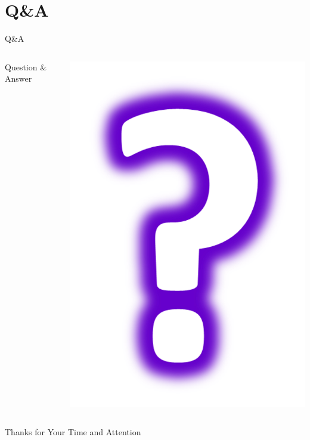 \section{Q\&A}
\begin{frame}{Q\&A}
\begin{columns}
\begin{column}{0.7\textwidth}
\begin{center}
    {\Huge Question \& Answer}

\end{center}

\end{column}
\begin{column}{0.3\textwidth}

\begin{center}
 \includegraphics[scale=0.33]{images/question.png}   
\end{center}
\end{column}
\end{columns}
\begin{center}
    {\huge Thanks for Your Time and Attention}
\end{center}
\end{frame}